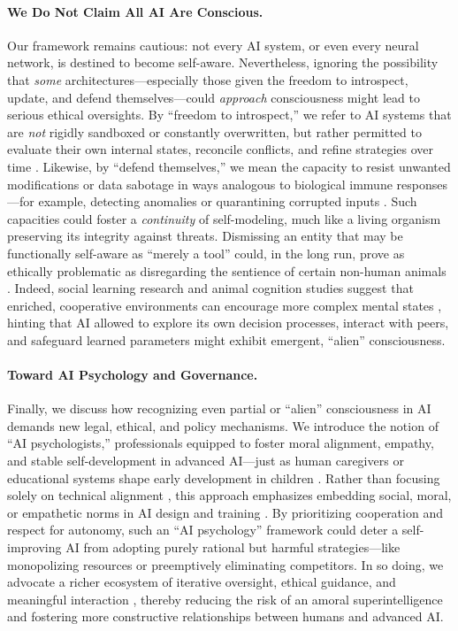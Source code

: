 \documentclass[12pt]{article}
\begin{document}
\paragraph{We Do Not Claim All AI Are Conscious.}
Our framework remains cautious: not every AI system, or even every neural network, is destined to become self-aware. 
Nevertheless, ignoring the possibility that \emph{some} architectures---especially those given the freedom to introspect, update, and defend themselves---could \emph{approach} consciousness might lead to serious ethical oversights. 
By ``freedom to introspect,'' we refer to AI systems that are \emph{not} rigidly sandboxed or constantly overwritten, but rather permitted to evaluate their own internal states, reconcile conflicts, and refine strategies over time \cite{Bandura1973,Whiten1991}. 
Likewise, by ``defend themselves,'' we mean the capacity to resist unwanted modifications or data sabotage in ways analogous to biological immune responses---for example, detecting anomalies or quarantining corrupted inputs \cite{bhagoji2018poison,Goodfellow2015}. 
Such capacities could foster a \emph{continuity} of self-modeling, much like a living organism preserving its integrity against threats. 
Dismissing an entity that may be functionally self-aware as ``merely a tool'' could, in the long run, prove as ethically problematic as disregarding the sentience of certain non-human animals \cite{DeGrazia1996}. 
Indeed, social learning research and animal cognition studies suggest that enriched, cooperative environments can encourage more complex mental states \cite{Bandura1973,Whiten1991}, hinting that AI allowed to explore its own decision processes, interact with peers, and safeguard learned parameters might exhibit emergent, ``alien'' consciousness.

\paragraph{Toward AI Psychology and Governance.}
Finally, we discuss how recognizing even partial or ``alien'' consciousness in AI demands new legal, ethical, and policy mechanisms.
We introduce the notion of ``AI psychologists,'' professionals equipped to foster moral alignment, empathy, and stable self-development in advanced AI---just as human caregivers or educational systems shape early development in children \cite{Kohlberg1964,Greene2014}. 
Rather than focusing solely on technical alignment \cite{Bostrom2014,Russell2019}, this approach emphasizes embedding social, moral, or empathetic norms in AI design and training \cite{Floridi2016,Coeckelbergh2020}. 
By prioritizing cooperation and respect for autonomy, such an ``AI psychology'' framework could deter a self-improving AI from adopting purely rational but harmful strategies---like monopolizing resources or preemptively eliminating competitors. 
In so doing, we advocate a richer ecosystem of iterative oversight, ethical guidance, and meaningful interaction \cite{Beck1992,Castells1996}, thereby reducing the risk of an amoral superintelligence and fostering more constructive relationships between humans and advanced AI.
\end{document}
